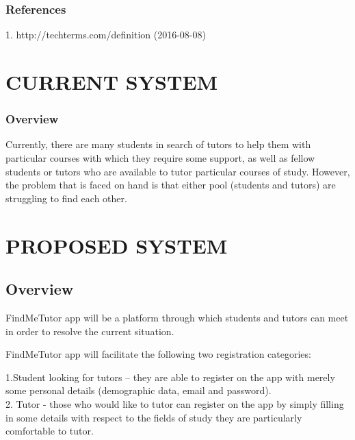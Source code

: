 \documentclass[12pt]{article}
\begin{document}
\subsubsection{References}
1. http://techterms.com/definition (2016-08-08)
\newpage

\section{CURRENT SYSTEM}
\subsubsection{Overview}
\begin{flushleft}
Currently, there are many students in search of tutors to help them with particular courses with which they require some support, as well as fellow students or tutors who are available to tutor particular courses of study. However, the problem that is faced on hand is that either pool (students and tutors) are struggling to find each other.
\end{flushleft}

\newpage

\section{PROPOSED SYSTEM}
\subsection{Overview}
\begin{flushleft}
FindMeTutor app will be a platform through which students and tutors can meet in order to resolve the current situation.
\end{flushleft}
\begin{flushleft}
FindMeTutor app will facilitate the following two registration categories:

\begin{flushleft}
1.Student looking for tutors – they are able to register on the app with merely some personal details (demographic data, email and password).\\
2. Tutor - those who would like to tutor can register on the app by simply filling in some details with respect to the fields of study they are particularly comfortable to tutor.\\
\end{flushleft}
\end{flushleft}
\end{document}
